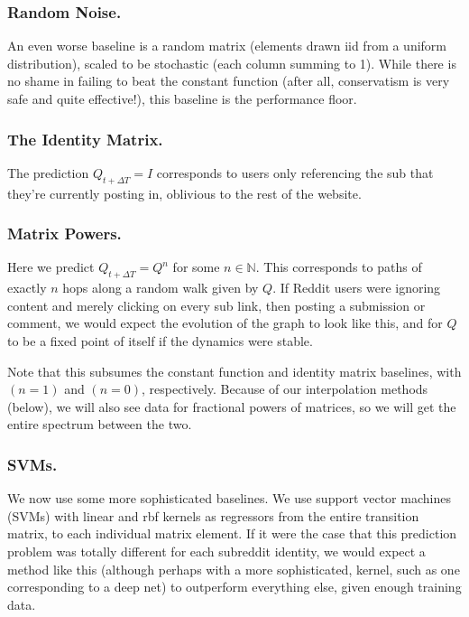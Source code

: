 \documentclass{article}
\theoremstyle{definition}
\begin{document}
	\subsubsection{Random Noise.} An even worse baseline is a random matrix (elements drawn iid from a uniform distribution), scaled to be stochastic (each column summing to 1). While there is no shame in failing to beat the constant function (after all, conservatism is very safe and quite effective!), this baseline is the performance floor.
	
	\subsubsection{The Identity Matrix.} The prediction $Q_{t+\Delta T} = I$ corresponds to users only referencing the sub that they're currently posting in, oblivious to the rest of the website.
	
	\subsubsection{Matrix Powers.} \label{sec:matrixpowers} Here we predict $Q_{t+\Delta T} = Q^{n}$ for some $n \in \mathbb N$. This corresponds to paths of exactly $n$ hops along a random walk given by $Q$. If Reddit users were ignoring content and merely clicking on every sub link, then posting a submission or comment, we would expect the evolution of the graph to look like this, and for $Q$ to be a fixed point of itself if the dynamics were stable.
	
	Note that this subsumes the constant function and identity matrix baselines, with $(n=1)$ and $(n=0)$, respectively. Because of our interpolation methods (below), we will also see data for fractional powers of matrices, so we will get the entire spectrum between the two.
	
	\subsubsection{SVMs.}
	We now use some more sophisticated baselines. We use support vector machines (SVMs) with linear and rbf kernels as regressors from the entire transition matrix, to each individual matrix element. If it were the case that this prediction problem was totally different for each subreddit identity, we would expect a method like this (although perhaps with a more sophisticated, kernel, such as one corresponding to a deep net) to outperform everything else, given enough training data.
	
\end{document}
